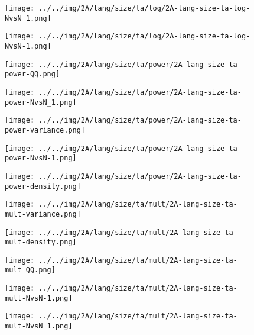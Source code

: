 \begin{figure}[H]
\centering	\texttt{[image: ../../img/2A/lang/size/ta/log/2A-lang-size-ta-log-NvsN\_1.png]}
\end{figure}
\begin{figure}[H]
\centering	\texttt{[image: ../../img/2A/lang/size/ta/log/2A-lang-size-ta-log-NvsN-1.png]}
\end{figure}
\begin{figure}[H]
\centering	\texttt{[image: ../../img/2A/lang/size/ta/power/2A-lang-size-ta-power-QQ.png]}
\end{figure}
\begin{figure}[H]
\centering	\texttt{[image: ../../img/2A/lang/size/ta/power/2A-lang-size-ta-power-NvsN\_1.png]}
\end{figure}
\begin{figure}[H]
\centering	\texttt{[image: ../../img/2A/lang/size/ta/power/2A-lang-size-ta-power-variance.png]}
\end{figure}
\begin{figure}[H]
\centering	\texttt{[image: ../../img/2A/lang/size/ta/power/2A-lang-size-ta-power-NvsN-1.png]}
\end{figure}
\begin{figure}[H]
\centering	\texttt{[image: ../../img/2A/lang/size/ta/power/2A-lang-size-ta-power-density.png]}
\end{figure}
\begin{figure}[H]
\centering	\texttt{[image: ../../img/2A/lang/size/ta/mult/2A-lang-size-ta-mult-variance.png]}
\end{figure}
\begin{figure}[H]
\centering	\texttt{[image: ../../img/2A/lang/size/ta/mult/2A-lang-size-ta-mult-density.png]}
\end{figure}
\begin{figure}[H]
\centering	\texttt{[image: ../../img/2A/lang/size/ta/mult/2A-lang-size-ta-mult-QQ.png]}
\end{figure}
\begin{figure}[H]
\centering	\texttt{[image: ../../img/2A/lang/size/ta/mult/2A-lang-size-ta-mult-NvsN-1.png]}
\end{figure}
\begin{figure}[H]
\centering	\texttt{[image: ../../img/2A/lang/size/ta/mult/2A-lang-size-ta-mult-NvsN\_1.png]}
\end{figure}
